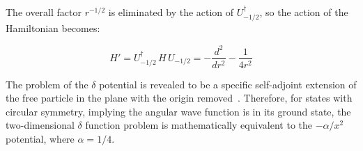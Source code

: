 \noindent
The overall factor $r^{-1/2}$ is eliminated by the action of $U_{-1/2}^\dagger$, so the action of the Hamiltonian becomes:

\begin{equation*}
    H' = U_{-1/2}^\dagger \, H \, U_{-1/2} = - \frac{d^2}{dr^2} - \frac{1}{4r^2}
\end{equation*}

\noindent
The problem of the $\delta$ potential is revealed to be a specific self-adjoint extension of the free particle in the plane with the origin removed~\cite{Jackiw:216395}. Therefore, for states with circular symmetry, implying the angular wave function is in its ground state, the two-dimensional $\delta$ function problem is mathematically equivalent to the $-\alpha/x^2$ potential, where $\alpha = 1/4$.